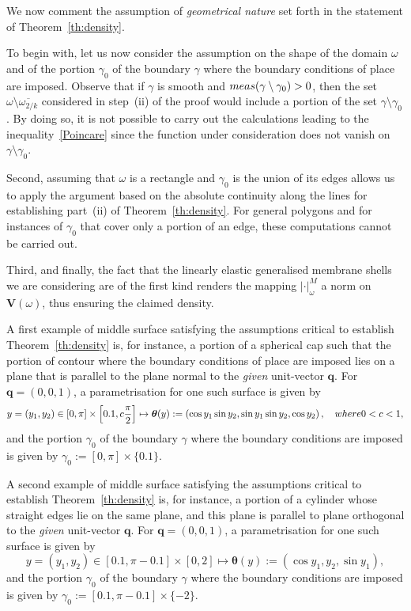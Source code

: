 \documentclass{amsart}
\begin{document}
We now comment the assumption of \emph{geometrical nature} set forth in the statement of Theorem~\ref{th:density}.

To begin with, let us now consider the assumption on the shape of the domain $\omega$ and of the portion $\gamma_0$ of the boundary $\gamma$ where the boundary conditions of place are imposed. Observe that if $\gamma$ is smooth and $\textup{meas}(\gamma\setminus\gamma_0) >0$, then the set $\omega\setminus\overline{\omega_{2/k}}$ considered in step~(ii) of the proof would include a portion of the set $\gamma\setminus\gamma_0$. By doing so, it is not possible to carry out the calculations leading to the inequality~\eqref{Poincare} since the function under consideration does not vanish on $\gamma \setminus \gamma_0$.

Second, assuming that $\omega$ is a rectangle and $\gamma_0$ is the union of its edges allows us to apply the argument based on the absolute continuity along the lines for establishing part~(ii) of Theorem~\ref{th:density}. For general polygons and for instances of $\gamma_0$ that cover only a portion of an edge, these computations cannot be carried out.

Third, and finally, the fact that the linearly elastic generalised membrane shells we are considering are of the first kind renders the mapping $|\cdot|_\omega^M$ a norm on $\bm{V}(\omega)$, thus ensuring the claimed density.

A first example of middle surface satisfying the assumptions critical to establish Theorem~\ref{th:density} is, for instance, a portion of a spherical cap such that the portion of contour where the boundary conditions of place are imposed lies on a plane that is parallel to the plane normal to the \emph{given} unit-vector $\bm{q}$. For $\bm{q}=(0,0,1)$, a parametrisation for one such surface is given by
\begin{equation*}
	y=(y_1,y_2) \in [0,\pi] \times \left[0.1,c\dfrac{\pi}{2}\right] \mapsto \bm{\theta}(y):=\left(\cos y_1\sin y_2, \sin y_1 \sin y_2, \cos y_2\right),\quad\textup{ where }0<c<1,
\end{equation*}
and the portion $\gamma_0$ of the boundary $\gamma$ where the boundary conditions are imposed is given by $\gamma_0:=[0,\pi]\times \{0.1\}$.

A second example of middle surface satisfying the assumptions critical to establish Theorem~\ref{th:density} is, for instance, a portion of a cylinder whose straight edges lie on the same plane, and this plane is parallel to plane orthogonal to the \emph{given} unit-vector $\bm{q}$. For $\bm{q}=(0,0,1)$, a parametrisation for one such surface is given by
\begin{equation*}
	y=(y_1,y_2) \in [0.1,\pi-0.1] \times [0,2] \mapsto \bm{\theta}(y):=\left(\cos y_1,y_2,\sin y_1\right),
\end{equation*}
and the portion $\gamma_0$ of the boundary $\gamma$ where the boundary conditions are imposed is given by $\gamma_0:=[0.1,\pi-0.1]\times \{-2\}$.
\end{document}
